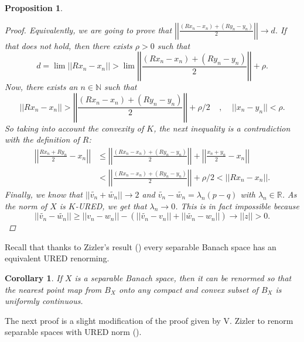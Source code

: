 \documentclass[11pt]{amsart}
\newcommand{\N}{\mathbb{N}}
\newcommand{\R}{\mathbb{R}}
\newcommand{\<}{\langle}
\renewcommand{\>}{\rangle}
\newtheorem{prop}[theorem]{Proposition}
\newtheorem{corollary}[theorem]{Corollary}
\theoremstyle{definition}
\theoremstyle{remark}
\numberwithin{equation}{section}
\def\R{{\mathbb R}}
\begin{document}
\begin{prop}
\begin{proof}
Equivalently, we are going to prove that $\left|\left| \frac{(Rx_n-x_n)+(Ry_n-y_n)}{2} \right|\right|\rightarrow d$. If that does not hold, then there exists $\rho>0$ such that
$$d=\lim||Rx_n-x_n||>\lim\left|\left| \frac{(Rx_n-x_n)+(Ry_n-y_n)}{2} \right|\right|+\rho.$$
Now, there exists an $n\in\N$ such that 
$$||Rx_n-x_n||>\left|\left| \frac{(Rx_n-x_n)+(Ry_n-y_n)}{2} \right|\right|+\rho/2\;\;\;\;,\;\;\;\;||x_n-y_n||<\rho.$$
So taking into account the convexity of $K$, the next inequality is a contradiction with the definition of $R$:
$$\begin{aligned} \left|\left| \frac{Rx_n+Ry_n}{2}-x_n \right|\right|&\le \left|\left| \frac{(Rx_n-x_n)+(Ry_n-y_n)}{2} \right|\right|+\left|\left| \frac{x_n+y_n}{2}-x_n \right|\right|\\
&<\left|\left| \frac{(Rx_n-x_n)+(Ry_n-y_n)}{2} \right|\right|+\rho/2<||Rx_n-x_n||. \end{aligned}$$
Finally, we know that $||\widetilde{v_n}+\widetilde{w_n}||\rightarrow 2$ and $\widetilde{v_n}-\widetilde{w_n}=\lambda_n(p-q)$ with $\lambda_n\in\R$. As the norm of $X$ is $K$-URED, we get that $\lambda_n\rightarrow0$. This is in fact impossible because
$$||\widetilde{v_n}-\widetilde{w_n}||\ge||v_n-w_n||-(||\widetilde{v_n}-v_n||+||\widetilde{w_n}-w_n||)\rightarrow||z||>0.$$
\end{proof}
\end{prop}

Recall that thanks to Zizler's result  (\cite{Ziz1}) every separable Banach space has an equivalent URED renorming.
\begin{corollary}
If $X$ is a  separable Banach space, then it can be renormed so that the nearest point map from $B_X$ onto any compact and convex subset of $B_X$ is uniformly continuous.
\end{corollary}

The next proof is a slight modification of the proof given by V. Zizler to renorm separable spaces with URED norm (\cite{Ziz1}).
\end{document}
